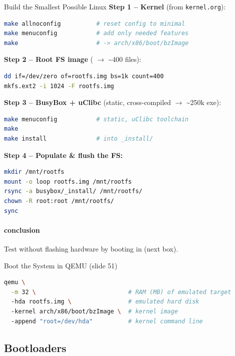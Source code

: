 \begin{KR}{Build the Smallest Possible Linux}
    \textbf{Step 1 -- Kernel} (from \texttt{kernel.org}):
\begin{lstlisting}[language=bash, style=basesmol, aboveskip=2pt, belowskip=2pt]
make allnoconfig          # reset config to minimal
make menuconfig           # add only needed features
make                      # -> arch/x86/boot/bzImage
\end{lstlisting}
    \textbf{Step 2 -- Root FS image} ( $\to$ \textasciitilde400 files):
\begin{lstlisting}[language=bash, style=basesmol, aboveskip=2pt, belowskip=2pt]
dd if=/dev/zero of=rootfs.img bs=1k count=400
mkfs.ext2 -i 1024 -F rootfs.img
\end{lstlisting}
    \textbf{Step 3 -- BusyBox + uClibc} (static, cross-compiled $\to$ \textasciitilde250k exe):
\begin{lstlisting}[language=bash, style=basesmol, aboveskip=2pt, belowskip=2pt]
make menuconfig           # static, uClibc toolchain
make
make install              # into _install/
\end{lstlisting}
    \textbf{Step 4 -- Populate \& flush the FS:}
\begin{lstlisting}[language=bash, style=basesmol, aboveskip=2pt, belowskip=2pt]
mkdir /mnt/rootfs
mount -o loop rootfs.img /mnt/rootfs
rsync -a busybox/_install/ /mnt/rootfs/
chown -R root:root /mnt/rootfs/
sync
\end{lstlisting}
    \paragraph{conclusion}
    Test without flashing hardware by booting in  (next box).
\end{KR}

\begin{examplecode}{Boot the System in QEMU (slide 51)}
\begin{lstlisting}[language=bash, style=basesmol, aboveskip=2pt, belowskip=2pt]
qemu \
  -m 32 \                          # RAM (MB) of emulated target
  -hda rootfs.img \                # emulated hard disk
  -kernel arch/x86/boot/bzImage \  # kernel image
  -append "root=/dev/hda"          # kernel command line
\end{lstlisting}
\end{examplecode}

\subsection{Bootloaders}

